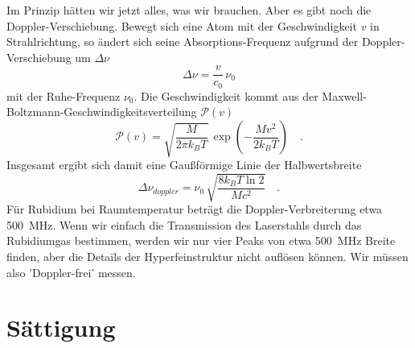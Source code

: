 Im Prinzip hätten wir jetzt alles, was wir brauchen. Aber es gibt noch die Doppler-Verschiebung. Bewegt sich eine Atom mit der Geschwindigkeit  $v$ in Strahlrichtung, so ändert sich seine Absorptions-Frequenz aufgrund der Doppler-Verschiebung um $\Delta \nu$
\begin{equation}
	\Delta \nu = \frac{v}{c_0} \, \nu_0
\end{equation}
mit der Ruhe-Frequenz $\nu_0$. Die Geschwindigkeit kommt  aus der  Maxwell-Boltzmann-Geschwindigkeitsverteilung $\mathcal{P}(v)$
\begin{equation}
	\mathcal{P}(v) = \sqrt{\frac{M}{2 \pi k_B T}} \, \exp \left (
	- \frac{M v^2}{2  k_B T}	
	\right) \quad .
\end{equation}
Insgesamt ergibt sich damit eine Gaußförmige  Linie der Halbwertsbreite 
\begin{equation}
	 \Delta \nu_{doppler} = \nu_0 \, \sqrt{\frac{8 k_B T \ln 2} {M c^2}} \quad .
\end{equation}
Für Rubidium bei Raumtemperatur beträgt die Doppler-Verbreiterung etwa 500~MHz. Wenn wir einfach die Transmission des Laserstahls durch das Rubidiumgas bestimmen, werden wir nur vier Peaks von etwa 500~MHz Breite finden, aber die Details der Hyperfeinstruktur nicht auflösen können. Wir müssen also 'Doppler-frei' messen.


\begin{questions}
\end{questions}


\section{Sättigung}


